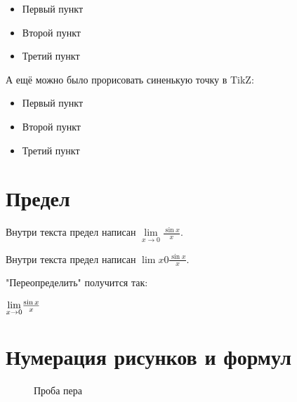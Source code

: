 \documentclass[12pt, a4paper]{article}
\theoremstyle{plain}              %
\theoremstyle{definition}         %
\begin{document}
\renewcommand{\labelitemi}{\LARGE{\textcolor{blue}{\textbullet}}}

\begin{itemize}
\item Первый пункт
\item Второй пункт
\item Третий пункт
\end{itemize}

А ещё можно было прорисовать синенькую точку в TikZ:

\newcommand*{\MyPoint}{\tikz \draw [baseline, fill=blue,draw=blue] circle (2.5pt);}
\renewcommand{\labelitemi}{\MyPoint}

\begin{itemize}
\item Первый пункт
\item Второй пункт
\item Третий пункт
\end{itemize}


\section{Предел}

\newcommand{\llim}[2]{\lim\limits_{{#1}\to{#2}}}

Внутри текста предел написан  $ \llim{x}{0} \frac{\sin{x}}{x}$.


Внутри текста предел написан  $ \lim{x}{0} \frac{\sin{x}}{x}$.


"Переопределить" получится так:

\renewcommand{\lim}{\underset{x \to 0}{\qopname \relax m{lim}}{\frac{\sin{x}}{x}}}



$\lim$



\section{Нумерация рисунков и формул}


\renewcommand{\thefigure}{\thesection:\arabic{figure}}    

\begin{figure}[H]
\center {} 
\caption{Проба пера}
\end{figure}
\end{document}
